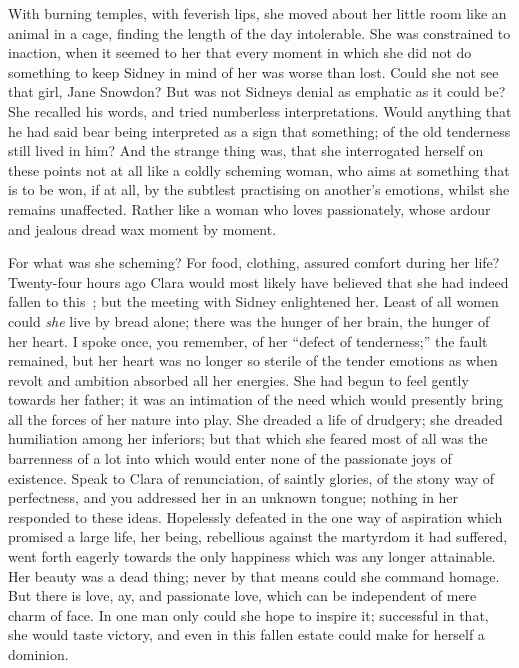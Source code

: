 {\protect\hypertarget{100}{}{}} With burning temples, with feverish
lips, she moved about her little room like an animal in a cage, finding
the length of the day intolerable. She was constrained to inaction, when
it seemed to her that every moment in which she did not do something to
keep Sidney in mind of her was worse than lost. Could she not see that
girl, Jane Snowdon? But was not Sidneys denial as emphatic as it could
be? She recalled his words, and tried numberless interpretations. Would
anything that he had said bear being interpreted as a sign that
something; of the old tenderness still lived in him? And the strange
thing was, that she interrogated herself on these points not at all like
a coldly scheming woman, who aims at something that is to be won, if at
all, by the subtlest practising on another's emotions, whilst she
remains unaffected. Rather like a woman who loves passionately, whose
ardour and jealous dread wax moment by moment.

For what was she scheming? For food, clothing, assured comfort during
her life? Twenty-four hours ago Clara would most likely have believed
that she had indeed fallen to this~; but the meeting with Sidney
{\protect\hypertarget{101}{}{}}enlightened her. Least of all women could
\emph{she} live by bread alone; there was the hunger of her brain, the
hunger of her heart. I spoke once, you remember, of her ``defect of
tenderness;'' the fault remained, but her heart was no longer so sterile
of the tender emotions as when revolt and ambition absorbed all her
energies. She had begun to feel gently towards her father; it was an
intimation of the need which would presently bring all the forces of her
nature into play. She dreaded a life of drudgery; she dreaded
humiliation among her inferiors; but that which she feared most of all
was the barrenness of a lot into which would enter none of the
passionate joys of existence. Speak to Clara of renunciation, of saintly
glories, of the stony way of perfectness, and you addressed her in an
unknown tongue; nothing in her responded to these ideas. Hopelessly
defeated in the one way of aspiration which promised a large life, her
being, rebellious against the martyrdom it had suffered, went forth
eagerly towards the only happiness which was any longer attainable. Her
beauty was a dead thing; never by that means could she command homage.
But there is love, ay, {\protect\hypertarget{102}{}{}}and passionate
love, which can be independent of mere charm of face. In one man only
could she hope to inspire it; successful in that, she would taste
victory, and even in this fallen estate could make for herself a
dominion.

